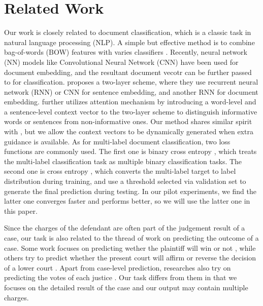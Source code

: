 \section{Related Work}
\label{sec_related_work}
Our work is closely related to document classification, which is a classic task in natural language processing (NLP). A simple but effective method is to combine bag-of-words (BOW) features with varies classifiers \cite{joachims1998text}. 
Recently, neural network (NN) models like Convolutional Neural Network (CNN) \cite{kim2014convolutional} have been used for document embedding, and the resultant document vecotr can be further passed to  for classification.
\cite{tang2015document} proposes a two-layer scheme, where they use recurrent neural network (RNN) or CNN for sentence embedding, and another RNN for document embedding. 
\cite{yang2016hierarchical} further utilizes attention mechanism by introducing a word-level and a sentence-level context vector to the two-layer scheme to distinguish informative words or sentences from non-informative ones. 
Our method shares similar spirit with \cite{yang2016hierarchical}, but we allow the context vectors to be dynamically generated when extra guidance is available. 
As for multi-label document classification, two loss functions are commonly used. 
The first one is binary cross entropy \cite{nam2014large}, which treats the multi-label classification task as multiple binary classification tasks. 
The second one is cross entropy \cite{kurata2016improved}, which converts the multi-label target to label distribution during training, and use a threshold selected via validation set to generate the final prediction during testing. In our pilot experiments, we find the latter one converges faster and performs better, so we will use the latter one in this paper.

Since the charges of the defendant are often part of the judgement result of a case, our task is also related to the thread of work on predicting the outcome of a case. Some work focuses on predicting wether the plaintiff will win or not \cite{bench1993neural,bruninghaus2003predicting,aletras2016predicting}, while others try to predict whether the present court will affirm or reverse the decision of a lower court \cite{martin2004competing,katz2016general}. Apart from case-level prediction, researches also try on predicting the votes of each justice \cite{martin2002dynamic,martin2004competing,lauderdale2014scaling,sim2015utility,katz2016general}. Our task differs from them in that we focuses on the detailed result of the case and our output may contain multiple charges.

